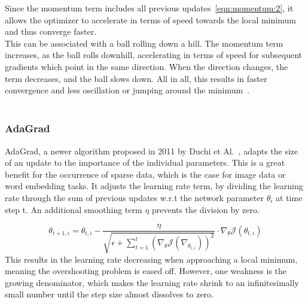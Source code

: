Since the momentum term includes all previous updates~\ref{eqn:momentum:2}, it allows the optimizer to accelerate in terms of speed towards
the local minimum and thus converge faster.\\
This can be associated with a ball rolling down a hill.
The momentum term increases, as the ball rolls downhill, accelerating in terms of speed for subsequent gradients
which point in the same direction.
When the direction changes, the term decreases, and the ball slows down.
All in all, this results in faster convergence and less oscillation or jumping around the minimum~\cite{optimizersoverview}.
\\\mbox{}\\
\subsubsection{\gls{AdaGrad}}
\gls{AdaGrad}, a newer algorithm proposed in 2011 by Duchi et Al.~\cite{adagrad},
adapts the size of an update to the importance of the individual parameters.
This is a great benefit for the occurrence of sparse data, which is the case for image data or word embedding tasks.
It adjusts the learning rate term, by dividing the learning rate through the sum
of previous updates w.r.t the network parameter $\theta_i$ at time step t.
An additional smoothing term $\eta$ prevents the division by zero.

\begin{equation}
    \theta_{t+1,i} = \theta_{t,i} - \frac{\eta}{\sqrt{\epsilon+\sum_{t=1}^{t}(\nabla_\theta\mathcal{J}(\nabla_{\theta_{t,i}}))^2}} \cdot \nabla_\theta\mathcal{J}(\theta_{t,i})
    \label{eqn:adagrad}
\end{equation}
This results in the learning rate decreasing when approaching a local minimum, meaning the overshooting problem is eased off.
However, one weakness is the growing denominator, which makes the learning rate shrink to an infinitesimally small number until the step
size almost dissolves to zero.
\\\mbox{}\\
